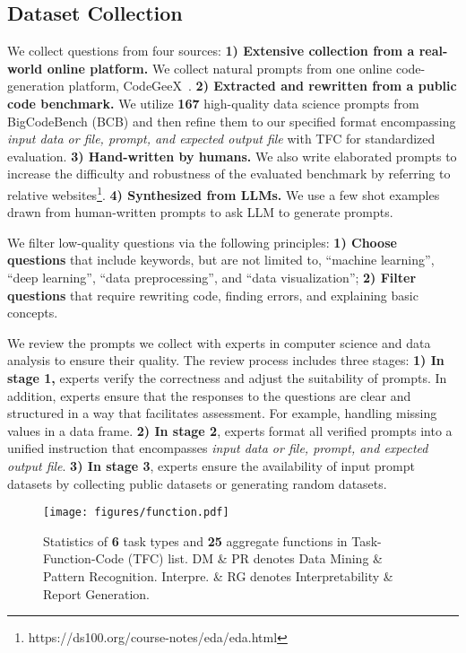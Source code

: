 \subsection{Dataset Collection}
We collect questions from four sources:
\textbf{1) Extensive collection from a real-world online platform.} We collect natural prompts from one online code-generation platform, CodeGeeX~\citep{zheng2023codegeex}.
\textbf{2) Extracted and rewritten from a public code benchmark.} We utilize \textbf{167} high-quality data science prompts from BigCodeBench (BCB) and then refine them to our specified format encompassing \textit{input data or file, prompt, and expected output file} with TFC for standardized evaluation.
\textbf{3) Hand-written by humans.} We also write elaborated prompts to increase the difficulty and robustness of the evaluated benchmark by referring to relative websites\footnote{https://ds100.org/course-notes/eda/eda.html}. 
\textbf{4) Synthesized from LLMs.} We use a few shot examples drawn from human-written prompts to ask LLM to generate prompts.

We filter low-quality questions via the following principles:
\textbf{1) Choose questions} that include keywords, but are not limited to, ``machine learning'', ``deep learning'', ``data preprocessing'', and ``data visualization'';
\textbf{2) Filter questions} that require rewriting code, finding errors, and explaining basic concepts.


We review the prompts we collect with experts in computer science and data analysis to ensure their quality.
The review process includes three stages:
\textbf{1) In stage 1,} experts verify the correctness and adjust the suitability of prompts. In addition, experts ensure that the responses to the questions are clear and structured in a way that facilitates assessment. For example, handling missing values in a data frame.
\textbf{2) In stage 2}, experts format all verified prompts into a unified instruction that encompasses \textit{input data or file, prompt, and expected output file}.
\textbf{3) In stage 3}, experts ensure the availability of input prompt datasets by collecting public datasets or generating random datasets.

\begin{figure}[t!]
    \centering
    \texttt{[image: figures/function.pdf]}
    \caption{Statistics of \textbf{6} task types and \textbf{25} aggregate functions in Task-Function-Code (TFC) list. DM \& PR denotes Data Mining \& Pattern Recognition. Interpre. \& RG denotes Interpretability \& Report Generation.}
    \label{fig: function}
    \vspace{-0.4cm}
\end{figure}

